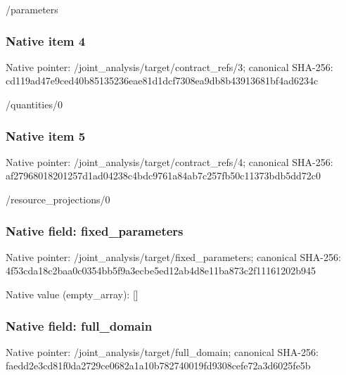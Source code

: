 \documentclass[10pt,a4paper]{article}
\begin{document}
\begingroup\raggedright\sloppy /\allowbreak{}parameters\par\endgroup

\subsubsection{Native item 4}
Native pointer: /joint\_\allowbreak{}analysis/target/contract\_\allowbreak{}refs/3; canonical SHA-256: cd119ad47e9ced40b85135236eae81d1dcf7308ea9db8b43913681bf4ad6234c

\begingroup\raggedright\sloppy /\allowbreak{}quantities/\allowbreak{}0\par\endgroup

\subsubsection{Native item 5}
Native pointer: /joint\_\allowbreak{}analysis/target/contract\_\allowbreak{}refs/4; canonical SHA-256: af27968018201257d1ad04238c4bdc9761a84ab7c257fb50c11373bdb5dd72c0

\begingroup\raggedright\sloppy /\allowbreak{}resource\_\allowbreak{}projections/\allowbreak{}0\par\endgroup

\subsubsection{Native field: fixed\_\allowbreak{}parameters}
Native pointer: /joint\_\allowbreak{}analysis/target/fixed\_\allowbreak{}parameters; canonical SHA-256: 4f53cda18c2baa0c0354bb5f9a3ecbe5ed12ab4d8e11ba873c2f11161202b945

Native value (empty\_\allowbreak{}array): []

\subsubsection{Native field: full\_\allowbreak{}domain}
Native pointer: /joint\_\allowbreak{}analysis/target/full\_\allowbreak{}domain; canonical SHA-256: faedd2e3cd81f0da2729ce0682a1a10b782740019fd9308cefe72a3d6025fe5b
\end{document}
